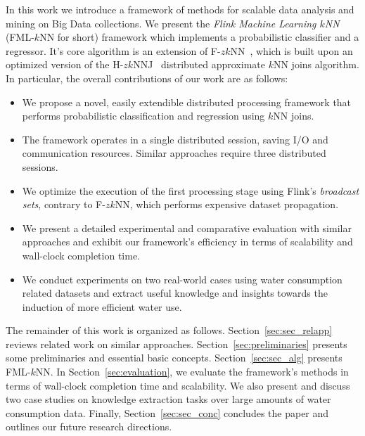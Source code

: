 In this work we introduce a framework of methods for scalable data analysis and mining on Big Data collections. We present the \textit{Flink Machine Learning $k$NN} (FML-$k$NN for short) framework which implements a probabilistic classifier and a regressor. It's core algorithm is an extension of F-$zk$NN~\cite{chatzigeorgakidis2015mapreduce}, which is built upon an optimized version of the H-$zk$NNJ~\cite{zhang2012epk} distributed approximate $k$NN joins algorithm. In particular, the overall contributions of our work are as follows:
\begin{itemize}
	\item We propose a novel, easily extendible distributed processing framework that performs probabilistic classification and regression using $k$NN joins.
	\item The framework operates in a single distributed session, saving I/O and communication resources. Similar approaches require three distributed sessions.
	\item We optimize the execution of the first processing stage using Flink's \textit{broadcast sets}, contrary to F-$zk$NN, which performs expensive dataset propagation.
	\item We present a detailed experimental and comparative evaluation with similar approaches and exhibit our framework's efficiency in terms of scalability and wall-clock completion time.
	\item We conduct experiments on two real-world cases using water consumption related datasets and extract useful knowledge and insights towards the induction of more efficient water use.
\end{itemize}

The remainder of this work is organized as follows. Section~\ref{sec:sec_relapp} reviews related work on similar approaches. Section~\ref{sec:preliminaries} presents some preliminaries and essential basic concepts. Section~\ref{sec:sec_alg} presents FML-$k$NN. In Section~\ref{sec:evaluation}, we evaluate the framework's methods in terms of wall-clock completion time and scalability. We also present and discuss two case studies on knowledge extraction tasks over large amounts of water consumption data. Finally, Section~\ref{sec:sec_conc} concludes the paper and outlines our future research directions.